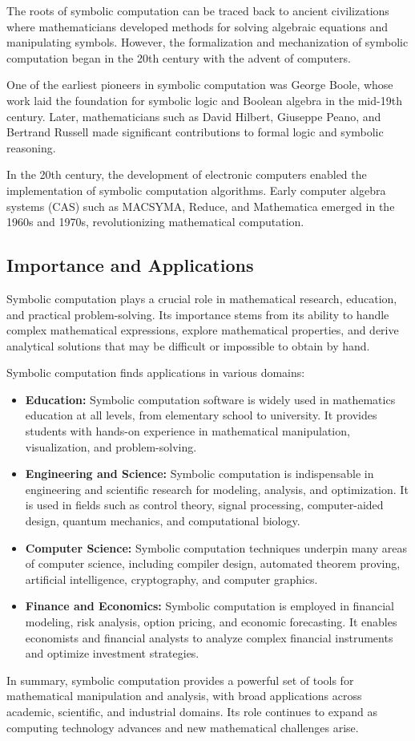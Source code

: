 The roots of symbolic computation can be traced back to ancient civilizations where mathematicians developed methods for solving algebraic equations and manipulating symbols. However, the formalization and mechanization of symbolic computation began in the 20th century with the advent of computers.

One of the earliest pioneers in symbolic computation was George Boole, whose work laid the foundation for symbolic logic and Boolean algebra in the mid-19th century. Later, mathematicians such as David Hilbert, Giuseppe Peano, and Bertrand Russell made significant contributions to formal logic and symbolic reasoning.

In the 20th century, the development of electronic computers enabled the implementation of symbolic computation algorithms. Early computer algebra systems (CAS) such as MACSYMA, Reduce, and Mathematica emerged in the 1960s and 1970s, revolutionizing mathematical computation.

\subsection{Importance and Applications}

Symbolic computation plays a crucial role in mathematical research, education, and practical problem-solving. Its importance stems from its ability to handle complex mathematical expressions, explore mathematical properties, and derive analytical solutions that may be difficult or impossible to obtain by hand.

Symbolic computation finds applications in various domains:
%
\begin{itemize}
  \setlength{\itemsep}{0.0em}
  \item \textbf{Education:} Symbolic computation software is widely used in mathematics education at all levels, from elementary school to university. It provides students with hands-on experience in mathematical manipulation, visualization, and problem-solving.
  \item \textbf{Engineering and Science:} Symbolic computation is indispensable in engineering and scientific research for modeling, analysis, and optimization. It is used in fields such as control theory, signal processing, computer-aided design, quantum mechanics, and computational biology.
  \item \textbf{Computer Science:} Symbolic computation techniques underpin many areas of computer science, including compiler design, automated theorem proving, artificial intelligence, cryptography, and computer graphics.
  \item \textbf{Finance and Economics:} Symbolic computation is employed in financial modeling, risk analysis, option pricing, and economic forecasting. It enables economists and financial analysts to analyze complex financial instruments and optimize investment strategies.
\end{itemize}
%
In summary, symbolic computation provides a powerful set of tools for mathematical manipulation and analysis, with broad applications across academic, scientific, and industrial domains. Its role continues to expand as computing technology advances and new mathematical challenges arise.

